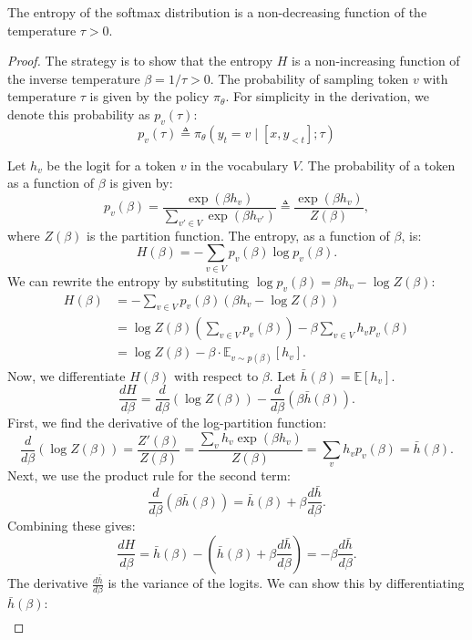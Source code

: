 \begin{proposition}
The entropy of the softmax distribution is a non-decreasing function of the temperature $\tau > 0$.
\end{proposition}

\begin{proof}
The strategy is to show that the entropy $H$ is a non-increasing function of the inverse temperature $\beta = 1/\tau > 0$.
The probability of sampling token $v$ with temperature $\tau$ is given by the policy $\pi_\theta$. For simplicity in the derivation, we denote this probability as $p_v(\tau)$:
\[
p_v(\tau) \triangleq \pi_\theta(y_t=v \mid [x, y_{<t}]; \tau)
\]

Let $h_v$ be the logit for a token $v$ in the vocabulary $V$. The probability of a token as a function of $\beta$ is given by:
\[
p_v(\beta) = \frac{\exp(\beta h_v)}{\sum_{v' \in V} \exp(\beta h_{v'})} \triangleq \frac{\exp(\beta h_v)}{Z(\beta)},
\]
where $Z(\beta)$ is the partition function. The entropy, as a function of $\beta$, is:
\[
H(\beta) = -\sum_{v \in V} p_v(\beta) \log p_v(\beta).
\]
We can rewrite the entropy by substituting $\log p_v(\beta) = \beta h_v - \log Z(\beta)$:
\begin{align*}
H(\beta) &= -\sum_{v \in V} p_v(\beta) (\beta h_v - \log Z(\beta)) \\
&= \log Z(\beta) \left(\sum_{v \in V} p_v(\beta)\right) - \beta \sum_{v \in V} h_v p_v(\beta) \\
&= \log Z(\beta) - \beta \cdot \mathbb{E}_{v \sim p(\beta)}[h_v].
\end{align*}
Now, we differentiate $H(\beta)$ with respect to $\beta$. Let $\bar{h}(\beta) = \mathbb{E}[h_v]$.
\[
\frac{dH}{d\beta} = \frac{d}{d\beta}(\log Z(\beta)) - \frac{d}{d\beta}(\beta \bar{h}(\beta)).
\]
First, we find the derivative of the log-partition function:
\[
\frac{d}{d\beta}(\log Z(\beta)) = \frac{Z'(\beta)}{Z(\beta)} = \frac{\sum_v h_v \exp(\beta h_v)}{Z(\beta)} = \sum_v h_v p_v(\beta) = \bar{h}(\beta).
\]
Next, we use the product rule for the second term:
\[
\frac{d}{d\beta}(\beta \bar{h}(\beta)) = \bar{h}(\beta) + \beta \frac{d\bar{h}}{d\beta}.
\]
Combining these gives:
\[
\frac{dH}{d\beta} = \bar{h}(\beta) - \left(\bar{h}(\beta) + \beta \frac{d\bar{h}}{d\beta}\right) = -\beta \frac{d\bar{h}}{d\beta}.
\]
The derivative $\frac{d\bar{h}}{d\beta}$ is the variance of the logits. We can show this by differentiating $\bar{h}(\beta)$:
\begin{align*}

\end{align*}
\end{proof}
